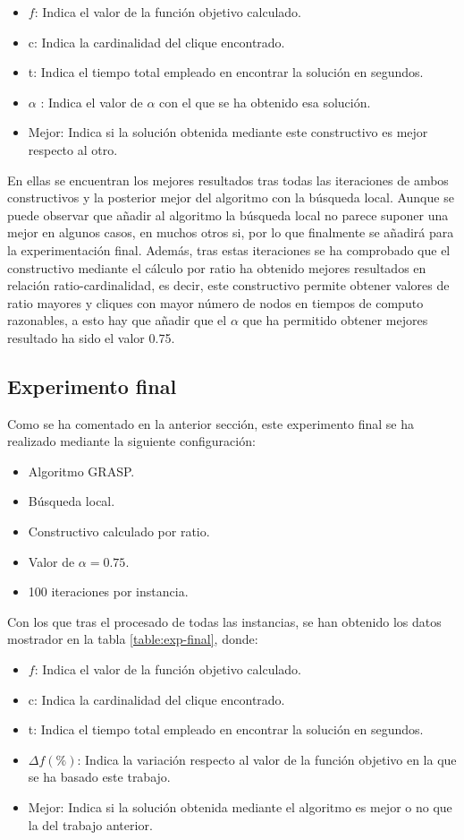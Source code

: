 \begin{itemize}
	\item $f$: Indica el valor de la función objetivo calculado.
	\item c: Indica la cardinalidad del clique encontrado.
	\item t: Indica el tiempo total empleado en encontrar la solución en segundos.
	\item $\alpha$ : Indica el valor de $\alpha$ con el que se ha obtenido esa solución.
	\item Mejor: Indica si la solución obtenida mediante este constructivo es mejor respecto al otro.
\end{itemize}

En ellas se encuentran los mejores resultados tras todas las iteraciones de ambos constructivos y la posterior mejor del algoritmo con la búsqueda local.
Aunque se puede observar que añadir al algoritmo la búsqueda local no parece suponer una mejor en algunos casos, en muchos otros si, por lo que finalmente se añadirá para la experimentación final. Además, tras estas iteraciones se ha comprobado que el constructivo mediante el cálculo por ratio ha obtenido mejores resultados en relación ratio-cardinalidad, es decir, este constructivo permite obtener valores de ratio mayores y cliques con mayor número de nodos en tiempos de computo razonables, a esto hay que añadir que el $\alpha$ que ha permitido obtener mejores resultado ha sido el valor 0.75.


\subsection{Experimento final}

Como se ha comentado en la anterior sección, este experimento final se ha realizado mediante la siguiente configuración:
\begin{itemize}
	\item Algoritmo \gls{GRASP}.
	\item Búsqueda local.
	\item Constructivo calculado por ratio.
	\item Valor de $\alpha = 0.75$. 
	\item 100 iteraciones por instancia.
\end{itemize}

Con los que tras el procesado de todas las instancias, se han obtenido los datos mostrador en la tabla \ref{table:exp-final}, donde:
\begin{itemize}
	\item $f$: Indica el valor de la función objetivo calculado.
	\item c: Indica la cardinalidad del clique encontrado.
	\item t: Indica el tiempo total empleado en encontrar la solución en segundos.
	\item $\Delta f (\%)$: Indica la variación respecto al valor de la función objetivo en la que se ha basado este trabajo.
	\item Mejor: Indica si la solución obtenida mediante el algoritmo es mejor o no que la del trabajo anterior.
\end{itemize}

